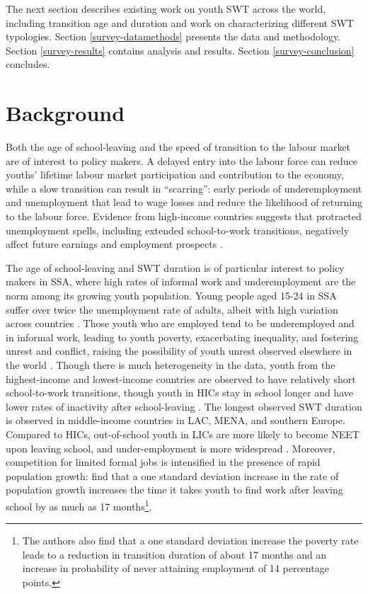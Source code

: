\documentclass[
  a4paper, twoside, 12pt]{book}
\begin{document}
The next section describes existing work on youth SWT across the world, including transition age and duration and work on characterizing different SWT typologies. Section \ref{survey-datamethods} presents the data and methodology. Section \ref{survey-results} contains analysis and results. Section \ref{survey-conclusion} concludes.

\hypertarget{survey-background}{%
\section{Background}\label{survey-background}}

Both the age of school-leaving and the speed of transition to the labour market are of interest to policy makers. A delayed entry into the labour force can reduce youths' lifetime labour market participation and contribution to the economy, while a slow transition can result in ``scarring'': early periods of underemployment and unemployment that lead to wage losses and reduce the likelihood of returning to the labour force. Evidence from high-income countries suggests that protracted unemployment spells, including extended school-to-work transitions, negatively affect future earnings and employment prospects \autocite{schmillen2017,emmenegger2017,moller2015,cockx2012}.

The age of school-leaving and SWT duration is of particular interest to policy makers in SSA, where high rates of informal work and underemployment are the norm among its growing youth population. Young people aged 15-24 in SSA suffer over twice the unemployment rate of adults, albeit with high variation across countries \autocite{africandevelopmentbank2016}. Those youth who are employed tend to be underemployed and in informal work, leading to youth poverty, exacerbating inequality, and fostering unrest and conflict, raising the possibility of youth unrest observed elsewhere in the world \autocite{urdal2006,mains2011}. Though there is much heterogeneity in the data, youth from the highest-income and lowest-income countries are observed to have relatively short school-to-work transitions, though youth in HICs stay in school longer and have lower rates of inactivity after school-leaving \autocite{manacorda2017,quintini2014}. The longest observed SWT duration is observed in middle-income countries in LAC, MENA, and southern Europe. Compared to HICs, out-of-school youth in LICs are more likely to become NEET upon leaving school, and under-employment is more widespread \autocite{quintini2014}. Moreover, competition for limited formal jobs is intensified in the presence of rapid population growth: \textcite{manacorda2017} find that a one standard deviation increase in the rate of population growth increases the time it takes youth to find work after leaving school by as much as 17 months\footnote{The authors also find that a one standard deviation increase the poverty rate leads to a reduction in transition duration of about 17 months and an increase in probability of never attaining employment of 14 percentage points.}.
\end{document}
